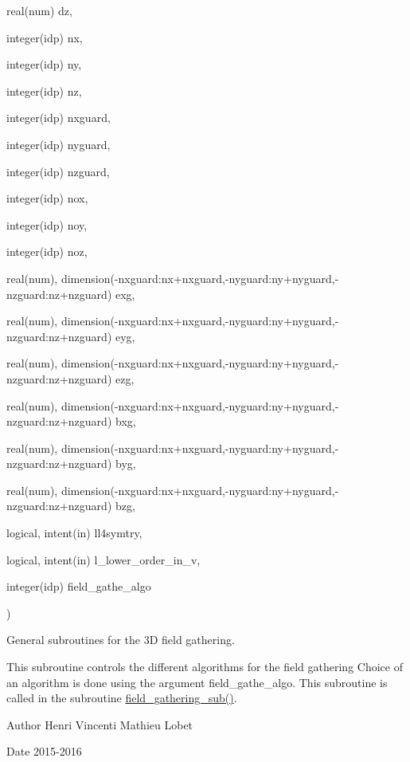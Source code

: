 {\begin{DoxyParamCaption}
\item[{real(num)}]{dz, }
\item[{integer(idp)}]{nx, }
\item[{integer(idp)}]{ny, }
\item[{integer(idp)}]{nz, }
\item[{integer(idp)}]{nxguard, }
\item[{integer(idp)}]{nyguard, }
\item[{integer(idp)}]{nzguard, }
\item[{integer(idp)}]{nox, }
\item[{integer(idp)}]{noy, }
\item[{integer(idp)}]{noz, }
\item[{real(num), dimension(-\/nxguard\+:nx+nxguard,-\/nyguard\+:ny+nyguard,-\/nzguard\+:nz+nzguard)}]{exg, }
\item[{real(num), dimension(-\/nxguard\+:nx+nxguard,-\/nyguard\+:ny+nyguard,-\/nzguard\+:nz+nzguard)}]{eyg, }
\item[{real(num), dimension(-\/nxguard\+:nx+nxguard,-\/nyguard\+:ny+nyguard,-\/nzguard\+:nz+nzguard)}]{ezg, }
\item[{real(num), dimension(-\/nxguard\+:nx+nxguard,-\/nyguard\+:ny+nyguard,-\/nzguard\+:nz+nzguard)}]{bxg, }
\item[{real(num), dimension(-\/nxguard\+:nx+nxguard,-\/nyguard\+:ny+nyguard,-\/nzguard\+:nz+nzguard)}]{byg, }
\item[{real(num), dimension(-\/nxguard\+:nx+nxguard,-\/nyguard\+:ny+nyguard,-\/nzguard\+:nz+nzguard)}]{bzg, }
\item[{logical, intent(in)}]{ll4symtry, }
\item[{logical, intent(in)}]{l\+\_\+lower\+\_\+order\+\_\+in\+\_\+v, }
\item[{integer(idp)}]{field\+\_\+gathe\+\_\+algo}
\end{DoxyParamCaption}
)}\hypertarget{field__gathering_8_f90_a02f8f275e2b38a13c4de92719714b016}{}\label{field__gathering_8_f90_a02f8f275e2b38a13c4de92719714b016}


General subroutines for the 3D field gathering. 

This subroutine controls the different algorithms for the field gathering Choice of an algorithm is done using the argument field\+\_\+gathe\+\_\+algo. This subroutine is called in the subroutine \hyperlink{field__gathering_8_f90_a3048fd8eb5e48d87fa67d382d260b22f}{field\+\_\+gathering\+\_\+sub()}. \begin{DoxyAuthor}{Author}
Henri Vincenti Mathieu Lobet 
\end{DoxyAuthor}
\begin{DoxyDate}{Date}
2015-\/2016 
\end{DoxyDate}

